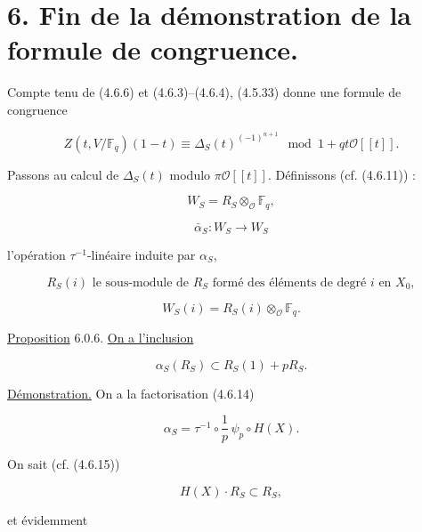 \section*{6. Fin de la démonstration de la formule de congruence.}

Compte tenu de (4.6.6) et (4.6.3)--(4.6.4), (4.5.33) donne une formule de
congruence

\begin{equation}\tag{6.0.1}
Z(t,V/\mathbb F_q)(1-t)
\equiv\Delta_S(t)^{(-1)^{n+1}}
\mod{1+qt\mathcal O[[t]]}.
\end{equation}

Passons au calcul de $\Delta_S(t)$ modulo $\pi\mathcal O[[t]]$. Définissons
(cf. (4.6.11)) :

\begin{equation}\tag{6.0.2}
W_S=R_S\otimes_{\mathcal O}\mathbb F_q,
\end{equation}


\begin{equation}\tag{6.0.3}
\bar\alpha_S:W_S\longrightarrow W_S
\end{equation}

\noindent
l'opération $\tau^{-1}$-linéaire induite par $\alpha_S$,

\begin{equation}\tag{6.0.4}
R_S(i)\text{ le sous-module de $R_S$ formé des éléments de degré $i$ en $X_0$},
\end{equation}

\begin{equation}\tag{6.0.5}
W_S(i)=R_S(i)\otimes_{\mathcal O}\mathbb F_q.
\end{equation}

\underline{Proposition} 6.0.6.
\underline{On a l'inclusion}

\[
\alpha_S(R_S)\subset R_S(1)+pR_S.
\]

\underline{Démonstration.}
On a la factorisation (4.6.14)

\begin{equation}\tag{6.0.7}
\alpha_S=\tau^{-1}\circ\frac1p\,\psi_p\circ H(X).
\end{equation}

On sait (cf. (4.6.15))

\begin{equation}\tag{6.0.8}
H(X)\cdot R_S\subset R_S,
\end{equation}

et évidemment

